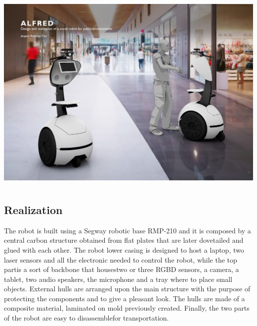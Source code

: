\begin{center}
\includegraphics[height=10cm]{fig/Tavola04.jpg}
\end{center}


\subsection{Realization}

The robot is built using a Segway robotic base RMP-210 and it is composed by a central carbon structure
obtained from flat plates that are later dovetailed and glued with each other.
The robot lower casing is designed to host a laptop, two laser sensors and all the electronic needed to control
the robot, while the top partis a sort of backbone that housestwo or three RGBD sensors, a camera, a tablet,
two audio speakers, the microphone and a tray where to place small objects.
External hulls are arranged upon the main structure with the purpose of protecting the components and to
give a pleasant look. The hulls are made of a composite material, laminated on mold previously created.
Finally, the two parts of the robot are easy to disassemblefor transportation.



